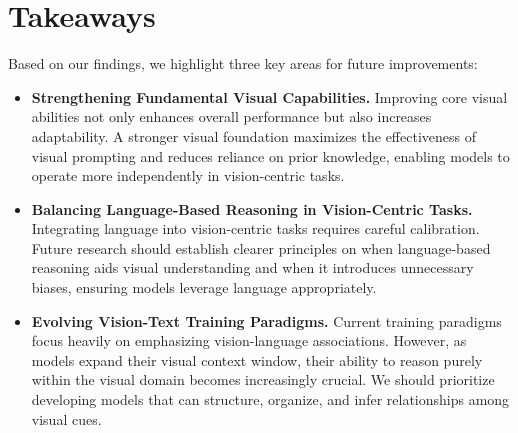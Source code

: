 \section{Takeaways}

Based on our findings, we highlight three key areas for future improvements:

\begin{itemize} \item \textbf{Strengthening Fundamental Visual Capabilities.} Improving core visual abilities not only enhances overall performance but also increases adaptability. A stronger visual foundation maximizes the effectiveness of visual prompting and reduces reliance on prior knowledge, enabling models to operate more independently in vision-centric tasks.

\item \textbf{Balancing Language-Based Reasoning in Vision-Centric Tasks.} Integrating language into vision-centric tasks requires careful calibration. Future research should establish clearer principles on when language-based reasoning aids visual understanding and when it introduces unnecessary biases, ensuring models leverage language appropriately.

\item \textbf{Evolving Vision-Text Training Paradigms.} Current training paradigms focus heavily on emphasizing vision-language associations. However, as models expand their visual context window, their ability to reason purely within the visual domain becomes increasingly crucial. We should prioritize developing models that can structure, organize, and infer relationships among visual cues.
\end{itemize}